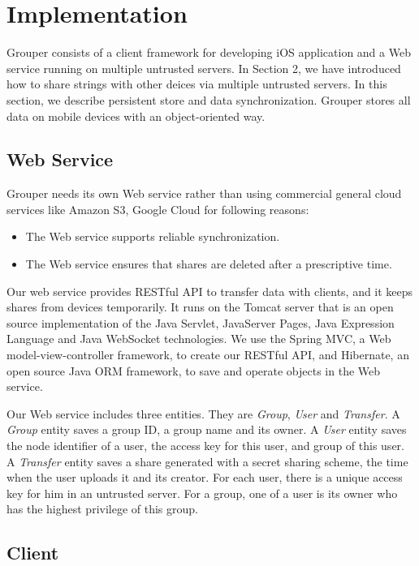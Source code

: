 \documentclass[twocolumn,10pt]{article}
\begin{document}
\section{Implementation}

Grouper consists of a client framework for developing iOS application and a Web service running on multiple untrusted servers. In Section 2, we have introduced how to share strings with other deices via multiple untrusted servers. In this section, we describe persistent store and data synchronization. Grouper stores all data on mobile devices with an object-oriented way.

\subsection{Web Service}
Grouper needs its own Web service rather than using commercial general cloud services like Amazon S3, Google Cloud for following reasons:

\begin{itemize}
	\setlength{\itemsep}{1pt}
	\setlength{\parskip}{0pt}
	\setlength{\parsep}{0pt}
	\item The Web service supports reliable synchronization.
	\item The Web service ensures that shares are deleted after a prescriptive time.
\end{itemize}

Our web service provides RESTful API to transfer data with clients, and it keeps shares from devices temporarily. It runs on the Tomcat server that is an open source implementation of the Java Servlet, JavaServer Pages, Java Expression Language and Java WebSocket technologies. We use the Spring MVC, a  Web model-view-controller framework, to create our RESTful API, and Hibernate, an open source Java ORM framework, to save and operate objects in the Web service. 

Our Web service includes three entities. They are \emph{Group}, \emph{User} and \emph{Transfer}. A \emph{Group} entity saves a group ID, a group name and its owner. A \emph{User} entity saves the node identifier of a user, the access key for this user, and group of this user. A \emph{Transfer} entity saves a share generated with a secret sharing scheme, the time when the user uploads it and its creator. For each user, there is a unique access key for him in an untrusted server. For a group, one of a user is its owner who has the highest privilege of this group.

\subsection{Client}
\end{document}
